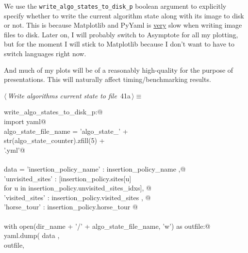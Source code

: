\documentclass[11.5pt]{report}
\begin{document}
\newchunk We use the \verb|write_algo_states_to_disk_p| boolean argument to explicitly specify whether to write 
the current algorithm state along with its image to disk or not. This is because Matplotlib and PyYaml
is \underline{very} slow when writing image files to disk. Later on, I will probably switch to Asymptote 
for all my plotting, but for the moment I will stick to Matplotlib because I don't want to have to switch languages right now. 
 
And much of my plots will be of a reasonably high-quality for the purpose of presentations. This will naturally 
affect timing/benchmarking results. 

\begin{flushleft} \small\label{scrap50}\raggedright\small
{} $\langle\,${\itshape Write algorithms current state to file}\nobreak\ {\footnotesize {41a}}$\,\rangle\equiv$
\vspace{-1ex}
\begin{list}{}{} \item
\mbox{}\verb@if write_algo_states_to_disk_p:@\\
\mbox{}\verb@     import yaml@\\
\mbox{}\verb@     algo_state_file_name = 'algo_state_'                    + \@\\
\mbox{}\verb@                       str(algo_state_counter).zfill(5) + \@\\
\mbox{}\verb@                       '.yml'@\\
\mbox{}\verb@@\\
\mbox{}\verb@     data = {'insertion_policy_name' : insertion_policy_name                       ,@\\
\mbox{}\verb@             'unvisited_sites'       : [insertion_policy.sites[u] \@\\
\mbox{}\verb@                                            for u in insertion_policy.unvisited_sites_idxs], @\\
\mbox{}\verb@             'visited_sites'         : insertion_policy.visited_sites                    , @\\
\mbox{}\verb@             'horse_tour'            : insertion_policy.horse_tour }@\\
\mbox{}\verb@@\\
\mbox{}\verb@     with open(dir_name + '/' + algo_state_file_name, 'w') as outfile:@\\
\mbox{}\verb@          yaml.dump( data   , \@\\
\mbox{}\verb@                     outfile, \@\\

\end{list}
\end{flushleft}
\end{document}
